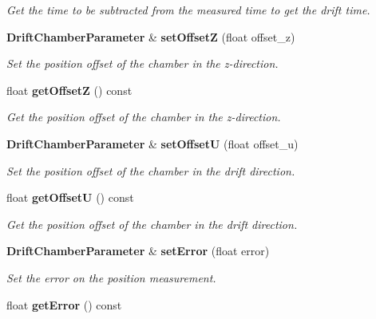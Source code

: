 \begin{DoxyCompactItemize}
\begin{DoxyCompactList}\small\item\em Get the time to be subtracted from the measured time to get the drift time. \item\end{DoxyCompactList}\item 
{\bf DriftChamberParameter} \& {\bf setOffsetZ} (float offset\_\-z)\label{classCALICE_1_1DriftChamberParameter_a0e43cdb564cb5929fd6785e684c83e85}

\begin{DoxyCompactList}\small\item\em Set the position offset of the chamber in the z-\/direction. \item\end{DoxyCompactList}\item 
float {\bf getOffsetZ} () const \label{classCALICE_1_1DriftChamberParameter_a1925ac170371b9574a3b4998c4b4f1f0}

\begin{DoxyCompactList}\small\item\em Get the position offset of the chamber in the z-\/direction. \item\end{DoxyCompactList}\item 
{\bf DriftChamberParameter} \& {\bf setOffsetU} (float offset\_\-u)\label{classCALICE_1_1DriftChamberParameter_a7f9a1ae51dfad2028a0b5993433c98cb}

\begin{DoxyCompactList}\small\item\em Set the position offset of the chamber in the drift direction. \item\end{DoxyCompactList}\item 
float {\bf getOffsetU} () const \label{classCALICE_1_1DriftChamberParameter_a2dd08e38dd7db22ee48b0272c1903b39}

\begin{DoxyCompactList}\small\item\em Get the position offset of the chamber in the drift direction. \item\end{DoxyCompactList}\item 
{\bf DriftChamberParameter} \& {\bf setError} (float error)\label{classCALICE_1_1DriftChamberParameter_a0512b63c9b0bee95b8e69d10c27ded14}

\begin{DoxyCompactList}\small\item\em Set the error on the position measurement. \item\end{DoxyCompactList}\item 
float {\bf getError} () const \label{classCALICE_1_1DriftChamberParameter_a8e971cf949cfad6d401fa191619da841}


\end{DoxyCompactItemize}
